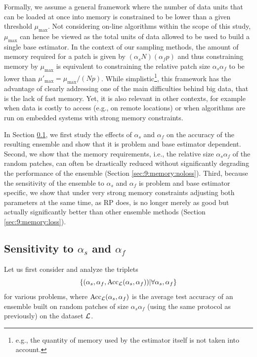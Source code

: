 Formally, we assume a general framework where the number of data units that can
be loaded at once into memory is constrained to be lower than a given threshold
$\mu_{\text{max}}$. Not considering on-line algorithms within the scope of this study,
$\mu_{\text{max}}$ can hence be viewed as the total units of data allowed to be used to
build a single base estimator. In the context of our sampling methods, the
amount of memory required for a patch is given by $(\alpha_s N)(\alpha_f p)$ and thus
constraining memory by $\mu_{\text{max}}$ is equivalent to constraining the relative
patch size $\alpha_s\alpha_f$ to be lower than $\mu'_{\text{max}}=\mu_{\text{max}}/(Np)$. While
simplistic\footnote{e.g., the quantity of memory used by the estimator itself
  is not taken into account.}, this framework has the advantage of clearly
addressing one of the main difficulties behind big data, that is the lack of
fast memory. Yet, it is also relevant in other contexts, for example when data
is costly to access (e.g., on remote locations) or when algorithms are run on embedded systems
with strong memory constraints.

In Section \ref{sec:9:memory:sensitivity}, we first study the effects of $\alpha_s$
and $\alpha_f$ on the accuracy of the resulting ensemble and show that it is problem
and base estimator dependent. Second, we show that the memory requirements,
i.e., the relative size $\alpha_s \alpha_f$ of the random patches, can often be
drastically reduced without significantly degrading the performance of the
ensemble (Section \ref{sec:9:memory:noloss}). Third, because the sensitivity of
the ensemble to $\alpha_s$ and $\alpha_f$ is problem and base estimator specific, we show
that under very strong memory constraints adjusting both parameters at the same
time, as RP does, is no longer merely as good but actually significantly better
than other ensemble methods (Section \ref{sec:9:memory:loss}).

\subsection{Sensitivity to $\alpha_s$ and $\alpha_f$}
\label{sec:9:memory:sensitivity}

Let us first consider and analyze the triplets
\begin{equation}
\{(\alpha_s, \alpha_f, \text{Acc}_{\cal L}(\alpha_s,\alpha_f)) | \forall \alpha_s, \alpha_f\}
\end{equation} for various problems, where $\text{Acc}_{\cal L}(\alpha_s,\alpha_f)$ is the average
test accuracy of an ensemble built on random patches of size $\alpha_s \alpha_f$ (using
the same protocol as previously) on the dataset ${\cal L}$.

